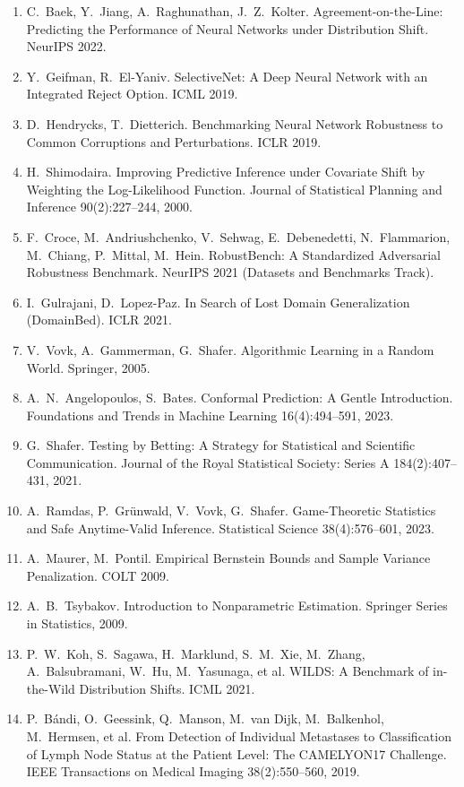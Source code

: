 \documentclass[conference]{IEEEtran}
\theoremstyle{plain}
\theoremstyle{definition}
\begin{document}
\begin{enumerate}
\item C.~Baek, Y.~Jiang, A.~Raghunathan, J.~Z.~Kolter. Agreement-on-the-Line: Predicting the Performance of Neural Networks under Distribution Shift. NeurIPS 2022.
\item Y.~Geifman, R.~El-Yaniv. SelectiveNet: A Deep Neural Network with an Integrated Reject Option. ICML 2019.
\item D.~Hendrycks, T.~Dietterich. Benchmarking Neural Network Robustness to Common Corruptions and Perturbations. ICLR 2019.
\item H.~Shimodaira. Improving Predictive Inference under Covariate Shift by Weighting the Log-Likelihood Function. Journal of Statistical Planning and Inference 90(2):227--244, 2000.
\item F.~Croce, M.~Andriushchenko, V.~Sehwag, E.~Debenedetti, N.~Flammarion, M.~Chiang, P.~Mittal, M.~Hein. RobustBench: A Standardized Adversarial Robustness Benchmark. NeurIPS 2021 (Datasets and Benchmarks Track).
\item I.~Gulrajani, D.~Lopez-Paz. In Search of Lost Domain Generalization (DomainBed). ICLR 2021.
\item V.~Vovk, A.~Gammerman, G.~Shafer. Algorithmic Learning in a Random World. Springer, 2005.
\item A.~N.~Angelopoulos, S.~Bates. Conformal Prediction: A Gentle Introduction. Foundations and Trends in Machine Learning 16(4):494--591, 2023.
\item G.~Shafer. Testing by Betting: A Strategy for Statistical and Scientific Communication. Journal of the Royal Statistical Society: Series A 184(2):407--431, 2021.
\item A.~Ramdas, P.~Gr\"unwald, V.~Vovk, G.~Shafer. Game-Theoretic Statistics and Safe Anytime-Valid Inference. Statistical Science 38(4):576--601, 2023.
\item A.~Maurer, M.~Pontil. Empirical Bernstein Bounds and Sample Variance Penalization. COLT 2009.
\item A.~B.~Tsybakov. Introduction to Nonparametric Estimation. Springer Series in Statistics, 2009.
\item P.~W.~Koh, S.~Sagawa, H.~Marklund, S.~M.~Xie, M.~Zhang, A.~Balsubramani, W.~Hu, M.~Yasunaga, et al. WILDS: A Benchmark of in-the-Wild Distribution Shifts. ICML 2021.
\item P.~B\'andi, O.~Geessink, Q.~Manson, M.~van Dijk, M.~Balkenhol, M.~Hermsen, et al. From Detection of Individual Metastases to Classification of Lymph Node Status at the Patient Level: The CAMELYON17 Challenge. IEEE Transactions on Medical Imaging 38(2):550--560, 2019.

\end{enumerate}
\end{document}

